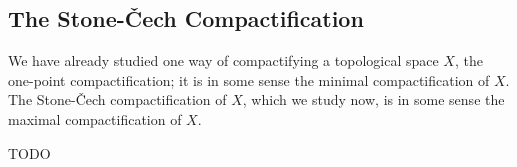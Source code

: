 \subsection{The Stone-\v{C}ech Compactification}

We have already studied one way of compactifying a topological space \( X \), the one-point compactification; it is in some sense the minimal compactification of \( X \).
The Stone-\v{C}ech compactification of \( X \), which we study now, is in some sense the maximal compactification of \( X \).

TODO %
